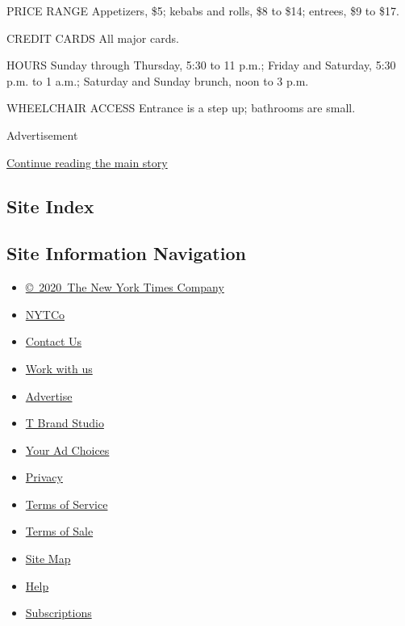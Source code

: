 PRICE RANGE Appetizers, \$5; kebabs and rolls, \$8 to \$14; entrees, \$9
to \$17.

CREDIT CARDS All major cards.

HOURS Sunday through Thursday, 5:30 to 11 p.m.; Friday and Saturday,
5:30 p.m. to 1 a.m.; Saturday and Sunday brunch, noon to 3 p.m.

WHEELCHAIR ACCESS Entrance is a step up; bathrooms are small.

Advertisement

\protect\hyperlink{after-bottom}{Continue reading the main story}

\hypertarget{site-index}{%
\subsection{Site Index}\label{site-index}}

\hypertarget{site-information-navigation}{%
\subsection{Site Information
Navigation}\label{site-information-navigation}}

\begin{itemize}
\tightlist
\item
  \href{https://help.nytimes3xbfgragh.onion/hc/en-us/articles/115014792127-Copyright-notice}{©~2020~The
  New York Times Company}
\end{itemize}

\begin{itemize}
\tightlist
\item
  \href{https://www.nytco.com/}{NYTCo}
\item
  \href{https://help.nytimes3xbfgragh.onion/hc/en-us/articles/115015385887-Contact-Us}{Contact
  Us}
\item
  \href{https://www.nytco.com/careers/}{Work with us}
\item
  \href{https://nytmediakit.com/}{Advertise}
\item
  \href{http://www.tbrandstudio.com/}{T Brand Studio}
\item
  \href{https://www.nytimes3xbfgragh.onion/privacy/cookie-policy\#how-do-i-manage-trackers}{Your
  Ad Choices}
\item
  \href{https://www.nytimes3xbfgragh.onion/privacy}{Privacy}
\item
  \href{https://help.nytimes3xbfgragh.onion/hc/en-us/articles/115014893428-Terms-of-service}{Terms
  of Service}
\item
  \href{https://help.nytimes3xbfgragh.onion/hc/en-us/articles/115014893968-Terms-of-sale}{Terms
  of Sale}
\item
  \href{https://spiderbites.nytimes3xbfgragh.onion}{Site Map}
\item
  \href{https://help.nytimes3xbfgragh.onion/hc/en-us}{Help}
\item
  \href{https://www.nytimes3xbfgragh.onion/subscription?campaignId=37WXW}{Subscriptions}
\end{itemize}
